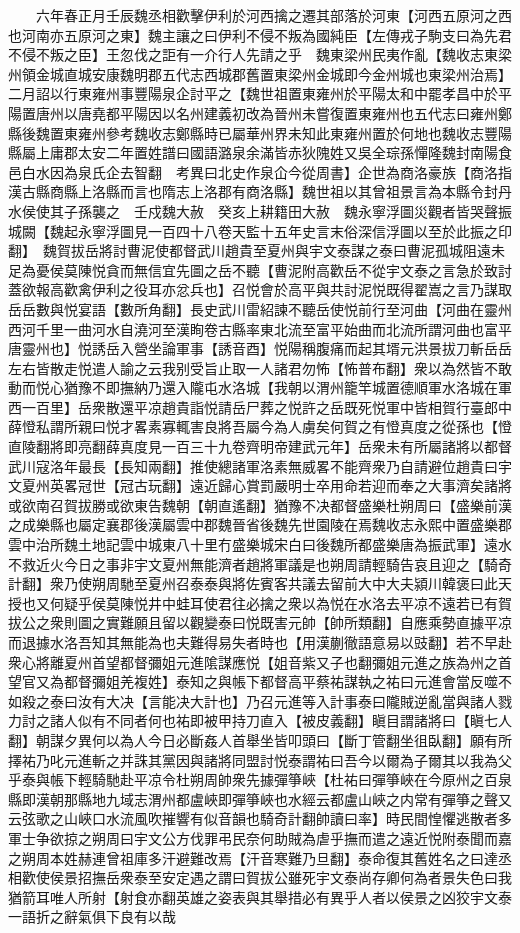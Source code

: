 　　六年春正月壬辰魏丞相歡擊伊利於河西擒之遷其部落於河東【河西五原河之西也河南亦五原河之東】魏主讓之曰伊利不侵不叛為國純臣【左傳戎子駒支曰為先君不侵不叛之臣】王忽伐之詎有一介行人先請之乎　魏東梁州民夷作亂【魏收志東梁州領金城直城安康魏明郡五代志西城郡舊置東梁州金城即今金州城也東梁州治焉】二月詔以行東雍州事豐陽泉企討平之【魏世祖置東雍州於平陽太和中罷孝昌中於平陽置唐州以唐堯都平陽因以名州建義初改為晉州未嘗復置東雍州也五代志曰雍州鄭縣後魏置東雍州參考魏收志鄭縣時已屬華州界未知此東雍州置於何地也魏收志豐陽縣屬上庸郡太安二年置姓譜曰國語潞泉余滿皆赤狄隗姓又吳全琮孫憚隆魏封南陽食邑白水因為泉氏企去智翻　考異曰北史作泉仚今從周書】企世為商洛豪族【商洛指漢古縣商縣上洛縣而言也隋志上洛郡有商洛縣】魏世祖以其曾祖景言為本縣令封丹水侯使其子孫襲之　壬戍魏大赦　癸亥上耕籍田大赦　魏永寧浮圖災觀者皆哭聲振城闕【魏起永寧浮圖見一百四十八卷天監十五年史言末俗深信浮圖以至於此振之印翻】　魏賀拔岳將討曹泥使都督武川趙貴至夏州與宇文泰謀之泰曰曹泥孤城阻遠未足為憂侯莫陳悦貪而無信宜先圖之岳不聽【曹泥附高歡岳不從宇文泰之言急於致討蓋欲報高歡禽伊利之役耳亦忿兵也】召悦會於高平與共討泥悦既得翟嵩之言乃謀取岳岳數與悦宴語【數所角翻】長史武川雷紹諫不聽岳使悦前行至河曲【河曲在靈州西河千里一曲河水自澆河至漢眴卷古縣率東北流至富平始曲而北流所謂河曲也富平唐靈州也】悦誘岳入營坐論軍事【誘音酉】悦陽稱腹痛而起其壻元洪景拔刀斬岳岳左右皆散走悦遣人諭之云我别受旨止取一人諸君勿怖【怖普布翻】衆以為然皆不敢動而悦心猶豫不即撫納乃還入隴屯水洛城【我朝以渭州籠竿城置德順軍水洛城在軍西一百里】岳衆散還平凉趙貴詣悦請岳尸葬之悦許之岳既死悦軍中皆相賀行臺郎中薛憕私謂所親曰悦才畧素寡輒害良將吾屬今為人虜矣何賀之有憕真度之從孫也【憕直陵翻將即亮翻薛真度見一百三十九卷齊明帝建武元年】岳衆未有所屬諸將以都督武川寇洛年最長【長知兩翻】推使總諸軍洛素無威畧不能齊衆乃自請避位趙貴曰宇文夏州英畧冠世【冠古玩翻】遠近歸心賞罰嚴明士卒用命若迎而奉之大事濟矣諸將或欲南召賀拔勝或欲東告魏朝【朝直遙翻】猶豫不决都督盛樂杜朔周曰【盛樂前漢之成樂縣也屬定襄郡後漢屬雲中郡魏晉省後魏先世園陵在焉魏收志永熙中置盛樂郡雲中治所魏土地記雲中城東八十里冇盛樂城宋白曰後魏所都盛樂唐為振武軍】遠水不救近火今日之事非宇文夏州無能濟者趙將軍議是也朔周請輕騎告哀且迎之【騎奇計翻】衆乃使朔周馳至夏州召泰泰與將佐賓客共議去留前大中大夫潁川韓褒曰此天授也又何疑乎侯莫陳悦井中蛙耳使君往必擒之衆以為悦在水洛去平凉不遠若已有賀拔公之衆則圖之實難願且留以觀變泰曰悦既害元帥【帥所類翻】自應乘勢直據平凉而退據水洛吾知其無能為也夫難得易失者時也【用漢蒯徹語意易以豉翻】若不早赴衆心將離夏州首望都督彌姐元進隂謀應悦【姐音紫又子也翻彌姐元進之族為州之首望官又為都督彌姐羌複姓】泰知之與帳下都督高平蔡祐謀執之祐曰元進會當反噬不如殺之泰曰汝有大决【言能决大計也】乃召元進等入計事泰曰隴賊逆亂當與諸人戮力討之諸人似有不同者何也祐即被甲持刀直入【被皮義翻】瞋目謂諸將曰【瞋七人翻】朝謀夕異何以為人今日必斷姦人首舉坐皆叩頭曰【斷丁管翻坐徂臥翻】願有所擇祐乃叱元進斬之并誅其黨因與諸將同盟討悦泰謂祐曰吾今以爾為子爾其以我為父乎泰與帳下輕騎馳赴平凉令杜朔周帥衆先據彈箏峽【杜祐曰彈箏峽在今原州之百泉縣即漢朝那縣地九域志渭州都盧峽即彈箏峽也水經云都盧山峽之内常有彈箏之聲又云弦歌之山峽口水流風吹摧響有似音韻也騎奇計翻帥讀曰率】時民間惶懼逃散者多軍士争欲掠之朔周曰宇文公方伐罪弔民奈何助賊為虐乎撫而遣之遠近悦附泰聞而嘉之朔周本姓赫連曾祖庫多汗避難改焉【汗音寒難乃旦翻】泰命復其舊姓名之曰達丞相歡使侯景招撫岳衆泰至安定遇之謂曰賀拔公雖死宇文泰尚存卿何為者景失色曰我猶箭耳唯人所射【射食亦翻英雄之姿表與其舉措必有異乎人者以侯景之凶狡宇文泰一語折之辭氣俱下良有以哉
